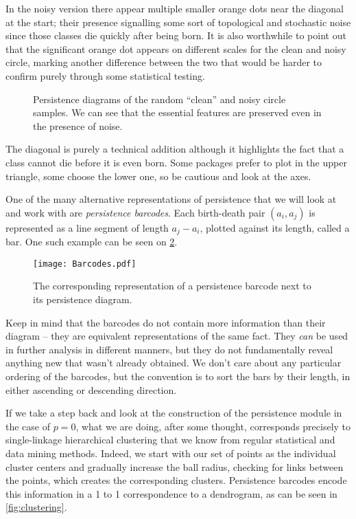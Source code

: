 In the noisy version there appear multiple smaller orange dots near the diagonal at the start; their presence signalling some sort of topological and stochastic noise since those classes die quickly after being born. It is also worthwhile to point out that the significant orange dot appears on different scales for the clean and noisy circle, marking another difference between the two that would be harder to confirm purely through some statistical testing.

\begin{figure}
    \centering
    \qquad
    \caption{Persistence diagrams of the random ``clean'' and noisy circle samples. We can see that the essential features are preserved even in the presence of noise.}
    \label{fig:clean_noisy_homologies}
\end{figure}

The diagonal is purely a technical addition although it highlights the fact that a class cannot die before it is even born. Some packages prefer to plot in the upper triangle, some choose the lower one, so be cautious and look at the axes.

One of the many alternative representations of persistence that we will look at and work with are \textit{persistence barcodes}. Each birth-death pair $(a_{i}, a_{j})$ is represented as a line segment of length $a_{j} - a_{i}$, plotted against its length, called a bar. One such example can be seen on \ref{fig:barcodes}.

\begin{figure}[h!]
  \centering
  \texttt{[image: Barcodes.pdf]}
  \caption{The corresponding representation of a persistence barcode next to its persistence diagram.}
  \label{fig:barcodes}
\end{figure}

Keep in mind that the barcodes do not contain more information than their diagram -- they are equivalent representations of the same fact. They \textit{can} be used in further analysis in different manners, but they do not fundamentally reveal anything new that wasn't already obtained. We don't care about any particular ordering of the barcodes, but the convention is to sort the bars by their length, in either ascending or descending direction.

If we take a step back and look at the construction of the persistence module in the case of $p = 0$, what we are doing, after some thought, corresponds precisely to single-linkage hierarchical clustering that we know from regular statistical and data mining methods. Indeed, we start with our set of points as the individual cluster centers and gradually increase the ball radius, checking for links between the points, which creates the corresponding clusters. Persistence barcodes encode this information in a 1 to 1 correspondence to a dendrogram, as can be seen in \ref{fig:clustering}.

